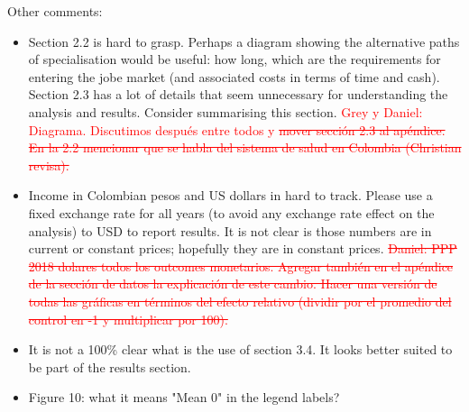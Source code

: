 \documentclass[12pt]{article}
\begin{document}
Other comments: 
\begin{itemize}
    \item Section 2.2 is hard to grasp. Perhaps a diagram showing the alternative paths of specialisation would be useful: how long, which are the requirements for entering the jobe market (and associated costs in terms of time and cash). Section 2.3 has a lot of details that seem unnecessary for understanding the analysis and results. Consider summarising this section.  \textcolor{red}{Grey y Daniel: Diagrama. Discutimos después entre todos y \st{mover sección 2.3 al apéndice. En la 2.2 mencionar que se habla del sistema de salud en Colombia (Christian revisa).}}
    \item Income in Colombian pesos and US dollars in hard to track. Please use a fixed exchange rate for all years (to avoid any exchange rate effect on the analysis) to USD to report results. It is not clear is those numbers are in current or constant prices; hopefully they are in constant prices.  \textcolor{red}{\st{Daniel: PPP 2018 dolares todos los outcomes monetarios. Agregar también en el apéndice de la sección de datos la explicación de este cambio. Hacer una versión de todas las gráficas en términos del efecto relativo (dividir por el promedio del control en -1 y multiplicar por 100).}}
    \item It is not a 100\% clear what is the use of section 3.4. It looks better suited to be part of the results section.
    \item Figure 10: what it means "Mean 0" in the legend labels?
\end{itemize}





%
%
\end{document}
